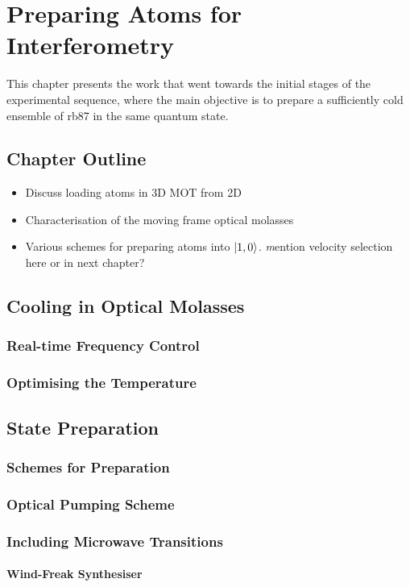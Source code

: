 \chapter{Preparing Atoms for Interferometry}\label{chap:atom_prep}
This chapter presents the work that went towards the initial stages of the experimental sequence, where the main objective is to prepare a sufficiently cold ensemble of \ac{rb87} in the same quantum state.
\section{Chapter Outline}
\begin{itemize}
    \item Discuss loading atoms in 3D MOT from 2D
    \item Characterisation of the moving frame optical molasses
    \item Various schemes for preparing atoms into \(\ket{1,0}\). {\textit mention velocity selection here or in next chapter?}
\end{itemize}

\section{Cooling in Optical Molasses}
\subsection{Real-time Frequency Control}
\subsection{Optimising the Temperature}

\section{State Preparation}\label{sec:state_prep}
\subsection{Schemes for Preparation}
\subsection{Optical Pumping Scheme}
\subsection{Including Microwave Transitions}
\subsubsection{Wind-Freak Synthesiser}